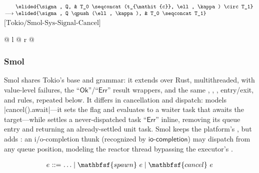 \vspace{1em}
\noindent
$\begin{array}[t]{@{}r@{\ }l@{\ }l@{}}
                & \elided{\sigma, Q, & T_0 \seqconcat (t_{\mathit{c}}, \ell, \kappa) \circ T_1} \\
\longrightarrow & \elided{\sigma, Q \qpush (\ell, \kappa), & T_0 \seqconcat T_1}
\end{array}$\hfill$\text{[Tokio/Smol-Sys-Signal-Cancel]}$\par
\noindent
\begin{tabular*}{\linewidth}{@{} l @{\extracolsep{\fill}} r @{}}
\end{tabular*}
\vspace{0.7em}

\subsubsection{Smol}

Smol shares Tokio's base and grammar: it extends \lasync over Rust, multithreaded, with value-level failures, the $\textsf{``Ok''}$/$\textsf{``Err''}$ result wrappers, and the same , , , entry/exit, and  rules, repeated below. It differs in cancellation and dispatch:  models \code|cancel().await|---it sets the flag and evaluates to a waiter task that awaits the target---while  settles a never-dispatched task $\textsf{``Err''}$ inline, removing its queue entry and returning an already-settled unit task. Smol keeps the platform's  , but adds : an i/o-completion thunk (recognized by $\mathsf{io\text{-}completion}$) may dispatch from any queue position, modeling the reactor thread bypassing the executor's .

$$
\begin{array}{r@{\ }c@{\ }l}
e & ::= & \ldots \mid \mathbfsf{spawn}\ e \mid \mathbfsf{cancel}\ e
\end{array}
$$

